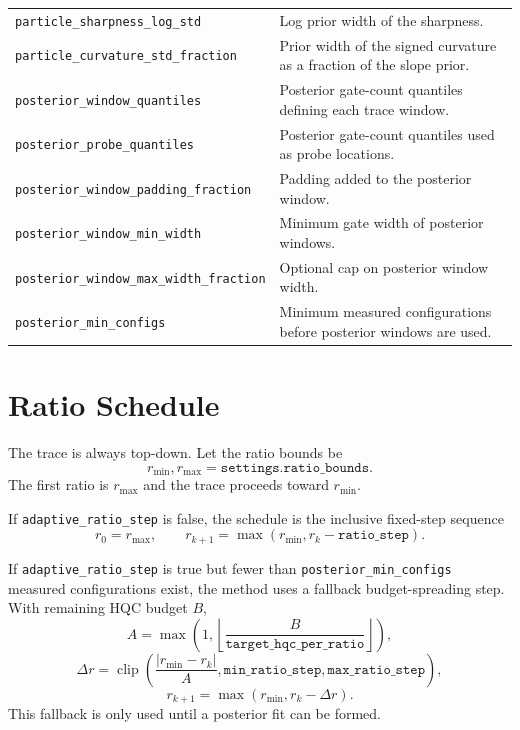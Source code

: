 \documentclass[11pt]{article}
\begin{document}
\begin{center}
\begin{tabular}{p{}p{}}
\texttt{particle\_sharpness\_log\_std} & Log prior width of the sharpness. \\
\texttt{particle\_curvature\_std\_fraction} & Prior width of the signed curvature as a fraction of the slope prior. \\
\texttt{posterior\_window\_quantiles} & Posterior gate-count quantiles defining each trace window. \\
\texttt{posterior\_probe\_quantiles} & Posterior gate-count quantiles used as probe locations. \\
\texttt{posterior\_window\_padding\_fraction} & Padding added to the posterior window. \\
\texttt{posterior\_window\_min\_width} & Minimum gate width of posterior windows. \\
\texttt{posterior\_window\_max\_width\_fraction} & Optional cap on posterior window width. \\
\texttt{posterior\_min\_configs} & Minimum measured configurations before posterior windows are used. \\
\bottomrule
\end{tabular}
\end{center}

\section{Ratio Schedule}

The trace is always top-down. Let the ratio bounds be
\[
    r_{\min}, r_{\max} = \texttt{settings.ratio\_bounds}.
\]
The first ratio is $r_{\max}$ and the trace proceeds toward $r_{\min}$.

If \texttt{adaptive\_ratio\_step} is false, the schedule is the inclusive
fixed-step sequence
\[
    r_0=r_{\max},\qquad
    r_{k+1}=\max(r_{\min}, r_k-\texttt{ratio\_step}).
\]

If \texttt{adaptive\_ratio\_step} is true but fewer than
\texttt{posterior\_min\_configs} measured configurations exist, the method
uses a fallback budget-spreading step. With remaining HQC budget $B$,
\[
    A = \max\left(1,\left\lfloor
        \frac{B}{\texttt{target\_hqc\_per\_ratio}}
    \right\rfloor\right),
\]
\[
    \Delta r =
    \operatorname{clip}
    \left(
        \frac{|r_{\min}-r_k|}{A},
        \texttt{min\_ratio\_step},
        \texttt{max\_ratio\_step}
    \right),
\]
\[
    r_{k+1}=\max(r_{\min}, r_k-\Delta r).
\]
This fallback is only used until a posterior fit can be formed.
\end{document}
